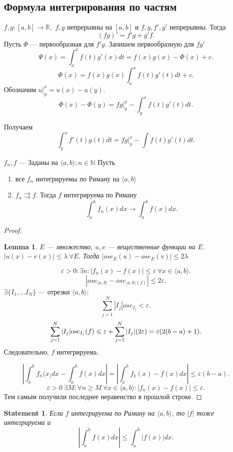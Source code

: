 \documentclass[11pt]{book}
\newcommand{\N}{\mathbb{N}}
\newcommand{\R}{\mathbb{R}}
\newcommand{\osc}{{\mathop{\text{\rm osc}}}}
\renewcommand{\le}{\leqslant}
\renewcommand{\ge}{\geqslant}
\theoremstyle{definition}
\theoremstyle{plain}
\theoremstyle{plain}
\newtheorem*{lm}{Lemma}
\newtheorem*{st}{Statement}
\theoremstyle{definition}
\theoremstyle{remark}
\begin{document}
\subsection{Формула интегрирования по частям}
$ f, g : [a, b] \to  \R, $ $ f, g$   непрерывны на $ [a, b]$ и $ f, g, f', g'$   непрерывны.
Тогда \[
    (fg)' = f' g+g'f
.\]
Пусть $ \Phi$ --- первообразная для $ f' g$.
Запишем первообразную для $ fg'$
\[
    \Psi (x) = \int_a^{x} f(t) g'(x) dt = f(x) g(x) - \Phi (x) + c
.\]
\[
    \Phi (x) = f(x) g(x) \int_a^{x} f(t) g'(t) dt + c
.\]
Обозначим $ u |_y^{x} = u(x) - u(y)$.
\[
    \Phi (x) - \Phi(y) = fg |_y^{x} - \int_y^{x} f(t)g'(t)dt
.\]

Получаем
\[
    \int_y^{x} f'(t) g(t) dt = fg |_y^{x} - \int f(t) g'(t) dt
.\]
\begin{thm}
    $ f_n, f$ --- Заданы на $ \langle a, b \rangle; n \in \N$
    Пусть
    \begin{enumerate}
	\item все $ f_n$ интегрируемы по Риману на $ \langle a, b \rangle$
	\item $ f_n \rightrightarrows f$. Тогда  $ f$ интегрируема по Риману
	    \[
		\int_a^{b}f_n(x) dx \to \int_a^{b}f(x) dx
	    .\]
    \end{enumerate}
\end{thm}
\begin{proof}
    \begin{lm}
	$ E$ --- множество, $ u, v $ --- вещественные функции на $ E$. $ |u(x) - v(x) | \le  \lambda ~ \forall  E.$
	Тогда $ |ose_E(u) - ose_E(v) | \le  2 \lambda$
    \end{lm}
    \[
	\varepsilon  >0: \exists  n: |f_n(x) - f(x)| \le \varepsilon ~ \forall x \in  \langle a, b \rangle
    .\]
    \[
	|ose_{\langle a, b \rangle} - ose_{_\langle a, b \rangle(f)}| \le 2 \varepsilon
    .\]
    $\exists  \{I_1, \ldots I_N \} $ --- отрезки $ \langle  a, b \rangle$:
    \[
	\sum_{j=1}^{N }|I_j| ose_{I_j} < \varepsilon
    .\]
    \[
	\sum_{j=1}^{N} |I_j| \osc_{I_j}(f)  \le  \varepsilon +\sum_{j=1}^{N} |I_j| (2 \varepsilon ) = \varepsilon (2 (b-a) + 1)
    .\]
    Следовательно, $ f$   интегрируема.

    \[
	\left|\int_a^{b} f_n(x_) dx - \int _a^{b}f(x) dx \right|= \left|\int_a^{b} f_1(x) - f(x) dx\right| \le  \varepsilon (b-a)
    .\]
    \[
	\varepsilon  >0  ~ \exists M : \forall n \ge M ~ \forall  x \in  \langle a, b \rangle: |f_n(x) - f(x) | \le  \varepsilon
    .\]
    Тем самым получили последнее неравенство в прошлой строке.
\end{proof}
\begin{st}
    Если $ f$ интегрируема по Риману на $ \langle  a,b \rangle$, то $ |f|$ тоже интегрируема и \[
	\left |\int_a ^{b} f(x) dx\right| \le  \int_a^{b} |f(x) |dx
    .\]
\end{st}
\end{document}
